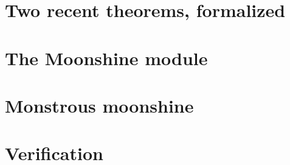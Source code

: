 \documentclass[11pt,openany]{book}
\theoremstyle{definition}
\theoremstyle{plain}
\begin{document}
\part{Two recent theorems, formalized}
\part{The Moonshine module}
\part{Monstrous moonshine}
\part{Verification}
\appendix

\end{document}
